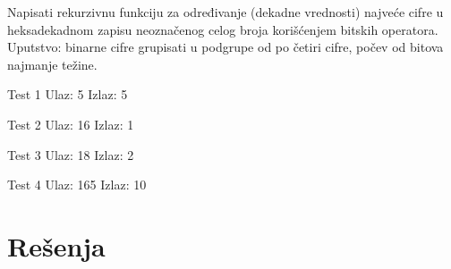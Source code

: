 \begin{Exercise}[label=120]
Napisati rekurzivnu funkciju za određivanje (dekadne vrednosti)
najveće cifre u heksadekadnom zapisu neoznačenog celog broja
korišćenjem bitskih operatora. Uputstvo: binarne cifre
grupisati u podgrupe od po četiri cifre, počev od bitova
najmanje težine.

\begin{minitest}
\begin{test}{Test 1}
Ulaz:  5
Izlaz: 5
\end{test}
\end{minitest}
\begin{minitest}
\begin{test}{Test 2}
Ulaz:  16
Izlaz: 1
\end{test}
\end{minitest}
\begin{minitest}
\begin{test}{Test 3}
Ulaz:  18
Izlaz: 2
\end{test}
\end{minitest}

\begin{minitest}
\begin{test}{Test 4}
Ulaz:  165
Izlaz: 10
\end{test}
\end{minitest}

\end{Exercise}
\begin{Answer}[ref=120]
\end{Answer}

\section{Rešenja}
\shipoutAnswer

